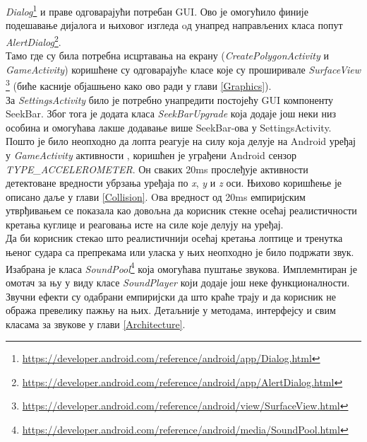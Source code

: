  \emph{Dialog}\footnote{\url{https://developer.android.com/reference/android/app/Dialog.html}} и праве одговарајући потребан GUI. 
 Ово је омогућило финије подешавање дијалога и њиховог изгледа oд унапред направљених класа попут \emph{AlertDialog}\footnote{\url{https://developer.android.com/reference/android/app/AlertDialog.html}}.
\\ \indent 
Тамо где су била потребна исцртавања на екрану (\emph{CreatePolygonActivity} и \emph{GameActivity}) коришћене су одговарајућe класе које су проширивале \emph{SurfaceView} \footnote{\url{https://developer.android.com/reference/android/view/SurfaceView.html}} (биће касније објашњено како ово ради у глави \ref{Graphics}). 
\\ \indent 
За \emph{SettingsActivity} било је потребно  унапредити постојећу GUI компоненту SeekBar. Због тога је додата класа \emph{SeekBarUpgrade} која додаје још неки низ особина и омогућава лакше додавање више SeekBar-ова у SettingsActivity. 
\\ \indent 
Пошто је било неопходно да лопта реагује на силу која делује на Android уређај у \emph{GameActivity} активности , коришћен је уграђени Android сензор 
\emph{TYPE\_ACCELEROMETER}.
Он сваких \si{20ms} прослеђује активности  детектоване вредности убрзања уређаја по \emph{x}, \emph{y} и \emph{z} оси. Њихово коришћење је описано даље у глави \ref{Collision}. Oва вредност од \si{20ms} емпиријским утврђивањем се показала као довољна да корисник стекне осећај реалистичности кретања куглице и реаговања исте на силе које делују на уређај. 
\\ \indent 
Да би корисник стекао што реалистичнији осећај кретања лоптице и тренутка њеног судара са препрекама или уласка у њих неопходно је било подржати звук. Изабрана је класа \emph{SoundPool}\footnote{\url{https://developer.android.com/reference/android/media/SoundPool.html}} која омогућава пуштање звукова. Имплемнтиран је омотач за њу у виду класе \emph{SoundPlayer} који додаје још неке функционалности. Звучни ефекти су одабрани емпиријски да што краће трају и да корисник не обража превелику пажњу на њих. Детаљније у методама, интерфејсу и свим класама за звукове у глави \ref{Architecture}.


